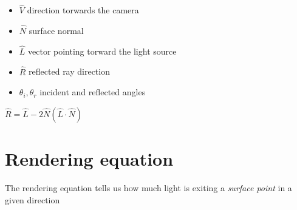 \documentclass{article}
\begin{document}
\begin{itemize}
    \item \(\hat{V}\) direction torwards the camera
    \item \(\hat{N}\) surface normal
    \item \(\hat{L}\) vector pointing torward the light source
    \item \(\hat{R}\) reflected ray direction
    \item \({\theta}_i, {\theta}_r\) incident and reflected angles
\end{itemize}

\(\hat{R}=\hat{L}-2\hat{N}(\hat{L}\cdot\hat{N})\)


\pagebreak

\section{Rendering equation}

The rendering equation tells us how much light is exiting a \textit{surface point}
in a given direction

\pagebreak

\nocite{*} %

\printbibliography
\end{document}
